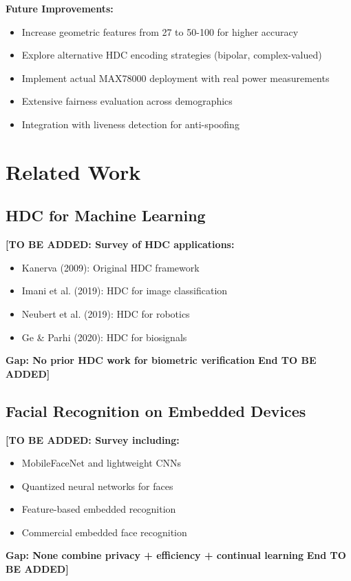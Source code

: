\documentclass[a4paper,12pt]{article}
\begin{document}
\textbf{Future Improvements:}
\begin{itemize}
    \item Increase geometric features from 27 to 50-100 for higher accuracy
    \item Explore alternative HDC encoding strategies (bipolar, complex-valued)
    \item Implement actual MAX78000 deployment with real power measurements
    \item Extensive fairness evaluation across demographics
    \item Integration with liveness detection for anti-spoofing
\end{itemize}

\newpage

\section{Related Work}

\subsection{HDC for Machine Learning}

\textbf{[TO BE ADDED: Survey of HDC applications:}
\begin{itemize}
    \item Kanerva (2009): Original HDC framework
    \item Imani et al. (2019): HDC for image classification
    \item Neubert et al. (2019): HDC for robotics
    \item Ge \& Parhi (2020): HDC for biosignals
\end{itemize}
\textbf{Gap: No prior HDC work for biometric verification}
\textbf{End TO BE ADDED]}

\subsection{Facial Recognition on Embedded Devices}

\textbf{[TO BE ADDED: Survey including:}
\begin{itemize}
    \item MobileFaceNet and lightweight CNNs
    \item Quantized neural networks for faces
    \item Feature-based embedded recognition
    \item Commercial embedded face recognition
\end{itemize}
\textbf{Gap: None combine privacy + efficiency + continual learning}
\textbf{End TO BE ADDED]}
\end{document}
